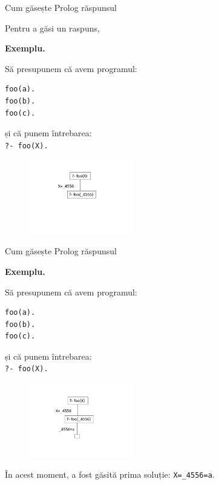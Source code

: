 \documentclass[xcolor=pdftex,romanian,colorlinks]{beamer}
\begin{document}
\begin{frame}[fragile]{Cum găsește Prolog răspunsul}

Pentru a găsi un raspuns, 

\textbf{\color{True} Exemplu.} 
\begin{multicols}{2}
Să presupunem că avem programul: 
\begin{verbatim}
foo(a). 
foo(b). 
foo(c).
\end{verbatim}
și că punem  întrebarea: \\
{\color{blue}\texttt{?- foo(X).}}
\columnbreak
\begin{figure}[h]
    \includegraphics[width=0.4\textwidth]{images/foo1}
\end{figure}
\end{multicols}

\end{frame}

\begin{frame}[fragile]{Cum găsește Prolog răspunsul}



\textbf{\color{True} Exemplu.} 
\begin{multicols}{2}
Să presupunem că avem programul: 
\begin{verbatim}
foo(a). 
foo(b). 
foo(c).
\end{verbatim}
și că punem întrebarea: \\
{\color{blue}\texttt{?- foo(X).}}
\columnbreak
\begin{figure}[h]
    \includegraphics[width=0.4\textwidth]{images/foo2}
\end{figure}
\end{multicols}

În acest moment, a fost găsită  prima soluție: \texttt{X=\_4556=a}.
\end{frame}
\end{document}
